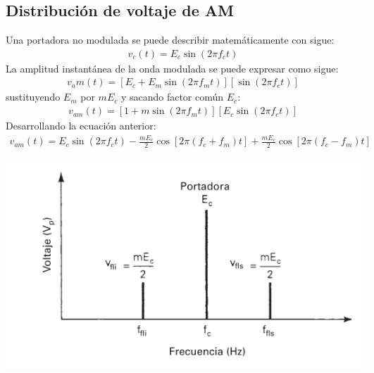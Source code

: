 \documentclass[10pt,a4paper]{article}
\begin{document}
\subsection{Distribución de voltaje de AM}
Una portadora no modulada se puede describir matemáticamente con sigue:
\begin{align}
	v_c(t)=E_c \sin(2\pi f_c t)
\end{align}
La amplitud instantánea de la onda modulada se puede expresar como sigue:
\begin{align}
	v_am(t)=[E_c+E_m \sin (2\pi f_m t)][\sin(2\pi f_c t)]
\end{align}
sustituyendo $E_m$ por $mE_c$ y sacando factor común $E_c$:
\begin{align}
	v_{am}(t)=[1+m\sin(2\pi f_m t)][E_c\sin(2\pi f_c t)]
\end{align}
Desarrollando la ecuación anterior:
\begin{align}
	v_{am}(t)=E_c\sin(2\pi f_c t)-\frac{mE_c}{2}\cos[2\pi(f_c+f_m)t]+\frac{mE_c}{2}\cos[2\pi(f_c-f_m)t]
\end{align}
\begin{center}
	\includegraphics[scale=0.5]{screenshot002}
\end{center}
\end{document}
